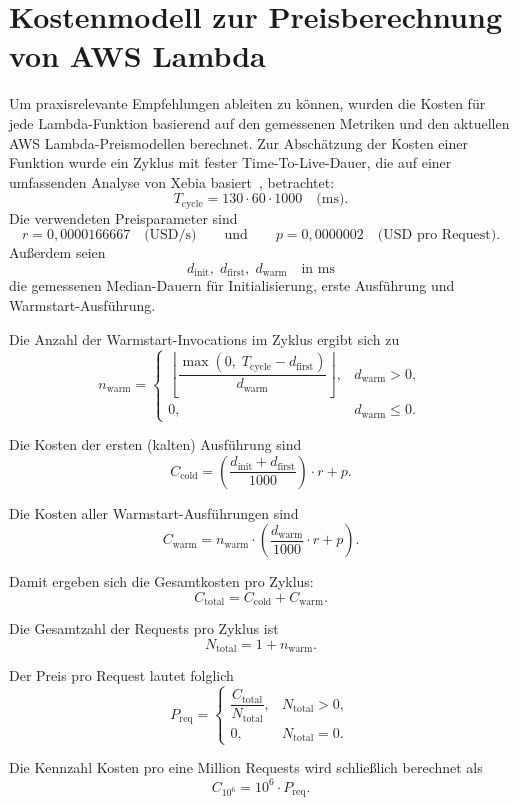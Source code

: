 \section{Kostenmodell zur Preisberechnung von AWS Lambda}
\label{sec:kostenmodell}
Um praxisrelevante Empfehlungen ableiten zu können, wurden die Kosten für jede 
Lambda-Funktion basierend auf den gemessenen Metriken und den aktuellen AWS Lambda-Preismodellen berechnet.
Zur Abschätzung der Kosten einer Funktion wurde ein Zyklus mit fester Time-To-Live-Dauer, die auf einer umfassenden
Analyse von Xebia basiert~\cite{XebiaLambdaTermination}, betrachtet:
\[
T_{\text{cycle}} = 130 \cdot 60 \cdot 1000 \quad \text{(ms)}.
\]
Die verwendeten Preisparameter sind
\[
r = 0{,}0000166667 \quad \text{(USD/s)} \qquad \text{und} \qquad
p = 0{,}0000002 \quad \text{(USD pro Request)}.
\]
Außerdem seien
\[
d_{\text{init}},\; d_{\text{first}},\; d_{\text{warm}} \quad \text{in ms}
\]
die gemessenen Median-Dauern für Initialisierung, erste Ausführung und Warmstart-Ausführung.

Die Anzahl der Warmstart-Invocations im Zyklus ergibt sich zu
\[
n_{\text{warm}}=
\begin{cases}
\left\lfloor \dfrac{\max(0,\; T_{\text{cycle}}-d_{\text{first}})}{d_{\text{warm}}}\right\rfloor, & d_{\text{warm}}>0,\\[8pt]
0, & d_{\text{warm}}\le 0.
\end{cases}
\]

Die Kosten der ersten (kalten) Ausführung sind
\[
C_{\text{cold}}=
\left(\frac{d_{\text{init}}+d_{\text{first}}}{1000}\right)\cdot r + p.
\]

Die Kosten aller Warmstart-Ausführungen sind
\[
C_{\text{warm}}=
n_{\text{warm}}\cdot\left(\frac{d_{\text{warm}}}{1000}\cdot r + p\right).
\]

Damit ergeben sich die Gesamtkosten pro Zyklus:
\[
C_{\text{total}} = C_{\text{cold}} + C_{\text{warm}}.
\]

Die Gesamtzahl der Requests pro Zyklus ist
\[
N_{\text{total}} = 1 + n_{\text{warm}}.
\]

Der Preis pro Request lautet folglich
\[
P_{\text{req}}=
\begin{cases}
\dfrac{C_{\text{total}}}{N_{\text{total}}}, & N_{\text{total}}>0,\\[8pt]
0, & N_{\text{total}}=0.
\end{cases}
\]

Die Kennzahl Kosten pro eine Million Requests wird schließlich berechnet als
\[
C_{10^6} = 10^6 \cdot P_{\text{req}}.
\]
